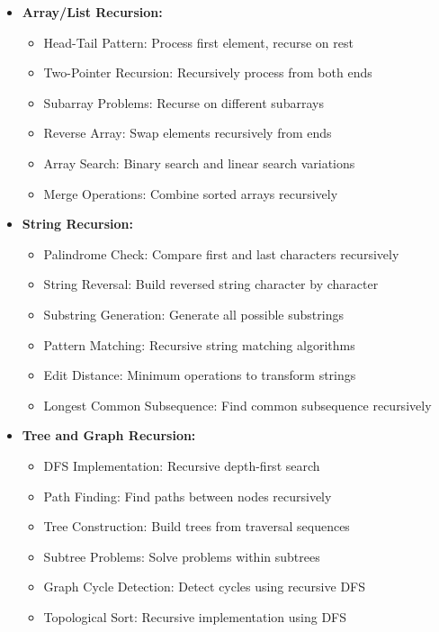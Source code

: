 \documentclass[a4paper,10pt]{book}
\begin{document}
\begin{itemize}[leftmargin=*]
    \item \textbf{Array/List Recursion:}
    \begin{itemize}
        \item Head-Tail Pattern: Process first element, recurse on rest
        \item Two-Pointer Recursion: Recursively process from both ends
        \item Subarray Problems: Recurse on different subarrays
        \item Reverse Array: Swap elements recursively from ends
        \item Array Search: Binary search and linear search variations
        \item Merge Operations: Combine sorted arrays recursively
    \end{itemize}

    \item \textbf{String Recursion:}
    \begin{itemize}
        \item Palindrome Check: Compare first and last characters recursively
        \item String Reversal: Build reversed string character by character
        \item Substring Generation: Generate all possible substrings
        \item Pattern Matching: Recursive string matching algorithms
        \item Edit Distance: Minimum operations to transform strings
        \item Longest Common Subsequence: Find common subsequence recursively
    \end{itemize}

    \item \textbf{Tree and Graph Recursion:}
    \begin{itemize}
        \item DFS Implementation: Recursive depth-first search
        \item Path Finding: Find paths between nodes recursively
        \item Tree Construction: Build trees from traversal sequences
        \item Subtree Problems: Solve problems within subtrees
        \item Graph Cycle Detection: Detect cycles using recursive DFS
        \item Topological Sort: Recursive implementation using DFS
    \end{itemize}
\end{itemize}
\end{document}
